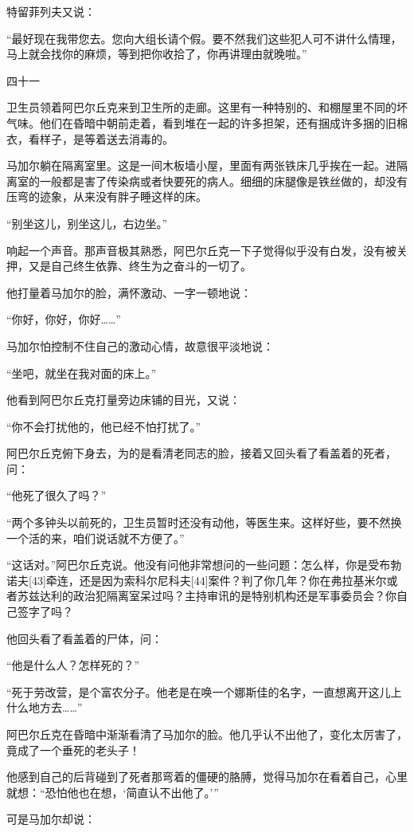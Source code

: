 特留菲列夫又说：

“最好现在我带您去。您向大组长请个假。要不然我们这些犯人可不讲什么情理，马上就会找你的麻烦，等到把你收拾了，你再讲理由就晚啦。”

四十一

卫生员领着阿巴尔丘克来到卫生所的走廊。这里有一种特别的、和棚屋里不同的坏气味。他们在昏暗中朝前走着，看到堆在一起的许多担架，还有捆成许多捆的旧棉衣，看样子，是等着送去消毒的。

马加尔躺在隔离室里。这是一间木板墙小屋，里面有两张铁床几乎挨在一起。进隔离室的一般都是害了传染病或者快要死的病人。细细的床腿像是铁丝做的，却没有压弯的迹象，从来没有胖子睡这样的床。

“别坐这儿，别坐这儿，右边坐。”

响起一个声音。那声音极其熟悉，阿巴尔丘克一下子觉得似乎没有白发，没有被关押，又是自己终生依靠、终生为之奋斗的一切了。

他打量着马加尔的脸，满怀激动、一字一顿地说：

“你好，你好，你好……”

马加尔怕控制不住自己的激动心情，故意很平淡地说：

“坐吧，就坐在我对面的床上。”

他看到阿巴尔丘克打量旁边床铺的目光，又说：

“你不会打扰他的，他已经不怕打扰了。”

阿巴尔丘克俯下身去，为的是看清老同志的脸，接着又回头看了看盖着的死者，问：

“他死了很久了吗？”

“两个多钟头以前死的，卫生员暂时还没有动他，等医生来。这样好些，要不然换一个活的来，咱们说话就不方便了。”

“这话对。”阿巴尔丘克说。他没有问他非常想问的一些问题：怎么样，你是受布勃诺夫[43]牵连，还是因为索科尔尼科夫[44]案件？判了你几年？你在弗拉基米尔或者苏兹达利的政治犯隔离室呆过吗？主持审讯的是特别机构还是军事委员会？你自己签字了吗？

他回头看了看盖着的尸体，问：

“他是什么人？怎样死的？”

“死于劳改营，是个富农分子。他老是在唤一个娜斯佳的名字，一直想离开这儿上什么地方去……”

阿巴尔丘克在昏暗中渐渐看清了马加尔的脸。他几乎认不出他了，变化太厉害了，竟成了一个垂死的老头子！

他感到自己的后背碰到了死者那弯着的僵硬的胳膊，觉得马加尔在看着自己，心里就想：“恐怕他也在想，‘简直认不出他了。’”

可是马加尔却说：

